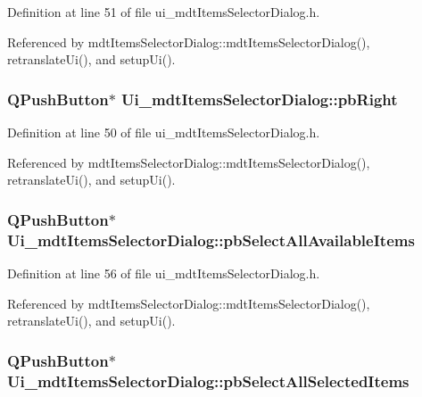Definition at line 51 of file ui\-\_\-mdt\-Items\-Selector\-Dialog.\-h.



Referenced by mdt\-Items\-Selector\-Dialog\-::mdt\-Items\-Selector\-Dialog(), retranslate\-Ui(), and setup\-Ui().

\hypertarget{class_ui__mdt_items_selector_dialog_a1ebf136195b79da55228a64bf0d48eee}{
\subsubsection[{pb\-Right}]{\setlength{\rightskip}{0pt plus 5cm}Q\-Push\-Button$\ast$ Ui\-\_\-mdt\-Items\-Selector\-Dialog\-::pb\-Right}}\label{class_ui__mdt_items_selector_dialog_a1ebf136195b79da55228a64bf0d48eee}


Definition at line 50 of file ui\-\_\-mdt\-Items\-Selector\-Dialog.\-h.



Referenced by mdt\-Items\-Selector\-Dialog\-::mdt\-Items\-Selector\-Dialog(), retranslate\-Ui(), and setup\-Ui().

\hypertarget{class_ui__mdt_items_selector_dialog_aa3963010b1fc3d53a98ebb10fb384a23}{
\subsubsection[{pb\-Select\-All\-Available\-Items}]{\setlength{\rightskip}{0pt plus 5cm}Q\-Push\-Button$\ast$ Ui\-\_\-mdt\-Items\-Selector\-Dialog\-::pb\-Select\-All\-Available\-Items}}\label{class_ui__mdt_items_selector_dialog_aa3963010b1fc3d53a98ebb10fb384a23}


Definition at line 56 of file ui\-\_\-mdt\-Items\-Selector\-Dialog.\-h.



Referenced by mdt\-Items\-Selector\-Dialog\-::mdt\-Items\-Selector\-Dialog(), retranslate\-Ui(), and setup\-Ui().

\hypertarget{class_ui__mdt_items_selector_dialog_a680134293d78490bd18e38774f1068d6}{
\subsubsection[{pb\-Select\-All\-Selected\-Items}]{\setlength{\rightskip}{0pt plus 5cm}Q\-Push\-Button$\ast$ Ui\-\_\-mdt\-Items\-Selector\-Dialog\-::pb\-Select\-All\-Selected\-Items}}\label{class_ui__mdt_items_selector_dialog_a680134293d78490bd18e38774f1068d6}


